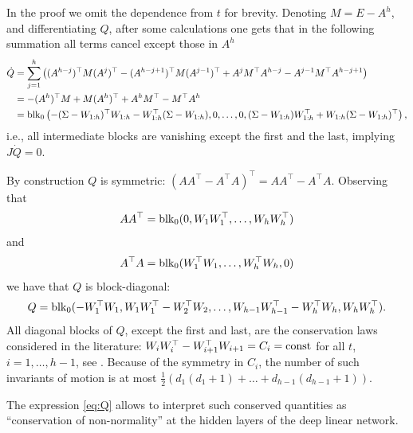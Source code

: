 \documentclass{article}
\makeatletter
\renewenvironment{proof}[1][\proofname]{
  \par\pushQED{\qed}\normalfont
  \topsep6\p@\@plus6\p@\relax
  \trivlist\item[\hskip\labelsep\bfseries#1\@addpunct{.}]
  \ignorespaces
}{
  \popQED\endtrivlist\@endpefalse
}
\def\block{{\rm blk}}
\newcommand{\1}{\mathds{1}}
\makeatother
\begin{document}
\begin{proof}
In the proof we omit the dependence from $t$ for brevity.
Denoting $M=E-A^h$, and differentiating $ Q$, after some calculations one gets that in the following summation all terms cancel except those in $ A^h$
\begin{align*}
\dot{Q} 
& = \sum_{j=1}^h \left( (A^{h-j})^\top M (A^j)^\top - (A^{h-j+1})^\top M (A^{j-1})^\top + A^{j} M^\top  A^{h-j}-  A^{j-1} M^\top  A^{h-j+1} \right) \\
& = - (A^h)^\top  M + M (A^h )^\top + A^h M^\top - M^\top A^h \\
& = \block_0 \left( - (\Sigma - W_{1:h} )^\top W_{1:h} - W_{1:h}^\top (\Sigma - W_{1:h} ) , 0, \ldots, 0, ( \Sigma - W_{1:h} ) W_{1:h}^\top + W_{1:h} ( \Sigma - W_{1:h} )^\top \right), \nonumber 
\end{align*}
i.e., all intermediate blocks are vanishing except the first and the last, implying $ J \dot{Q}=0$. 
\end{proof}
By construction $ Q $ is symmetric: $ (A A^\top - A^\top A )^\top = A A^\top - A^\top A $.
Observing that 
\[
A A^\top =\block_0 (0, W_1 W_1^\top, \ldots,  W_h W_h^\top)
\]
and 
\[
A^\top A =\block_0 (W_1^\top W_1, \ldots,  W_h^\top W_h, 0)
\]
we have that $ Q $ is block-diagonal:
\[
Q = \block_0 (- W_1^\top W_1, W_1 W_1^\top - W_2^\top W_2 , \ldots,W_{h-1} W_{h-1}^\top - W_h^\top W_h ,W_h W_h^\top  ).
\]
All diagonal blocks of $ Q$, except the first and last, are the conservation laws considered in the literature: $ W_i W_i^\top - W_{i+1}^\top W_{i+1} = C_i = {\rm const}$ for all $t$, $ i=1,\ldots, h-1$, see \cite{chitour2018geometric}. 
Because of the symmetry in $C_i $, the number of such invariants of motion is at most $  \frac{1}{2} \left(  d_1(d_1+1) + \ldots + d_{h-1} (d_{h-1}+1)\right) $.

The expression \eqref{eq:Q} allows to interpret such conserved quantities as ``conservation of non-normality'' at the hidden layers of the deep linear network. 
\end{document}
